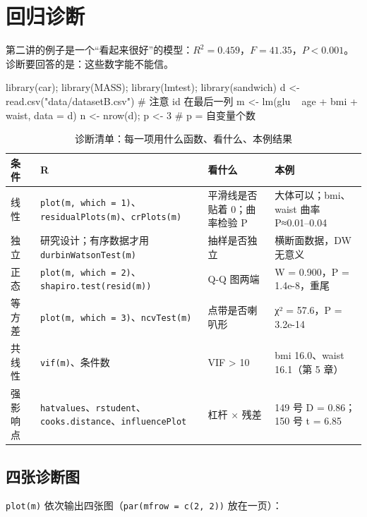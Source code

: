 \section{回归诊断}

第二讲的例子是一个“看起来很好”的模型：$R^2=0.459$，$F=41.35$，$P<0.001$。诊断要回答的是：这些数字能不能信。

\begin{RCode}[R · 模型]
library(car); library(MASS); library(lmtest); library(sandwich)
d <- read.csv("data/datasetB.csv")          # 注意 id 在最后一列
m <- lm(glu ~ age + bmi + waist, data = d)
n <- nrow(d); p <- 3                        # p = 自变量个数
\end{RCode}

\begin{table}[htbp]
\centering\small
\caption{诊断清单：每一项用什么函数、看什么、本例结果}
\label{tab:diag}
\begin{tabular}{@{}p{1.7cm}p{4.6cm}p{3.6cm}p{4.4cm}@{}}
\toprule
条件 & R & 看什么 & 本例\\
\midrule
线性 & \Verb|plot(m, which = 1)|、\Verb|residualPlots(m)|、\Verb|crPlots(m)| & 平滑线是否贴着 0；曲率检验 P & 大体可以；bmi、waist 曲率 P≈0.01–0.04\\
独立 & 研究设计；有序数据才用 \Verb|durbinWatsonTest(m)| & 抽样是否独立 & 横断面数据，DW 无意义\\
正态 & \Verb|plot(m, which = 2)|、\Verb|shapiro.test(resid(m))| & Q-Q 图两端 & W = 0.900，P = 1.4e-8，重尾\\
等方差 & \Verb|plot(m, which = 3)|、\Verb|ncvTest(m)| & 点带是否喇叭形 & χ² = 57.6，P = 3.2e-14\\
共线性 & \Verb|vif(m)|、条件数 & VIF > 10 & bmi 16.0、waist 16.1（第 5 章）\\
强影响点 & \Verb|hatvalues|、\Verb|rstudent|、\Verb|cooks.distance|、\Verb|influencePlot| & 杠杆 × 残差 & 149 号 D = 0.86；150 号 t = 6.85\\
\bottomrule
\end{tabular}
\end{table}

\subsection{四张诊断图}
\Verb|plot(m)| 依次输出四张图（\Verb|par(mfrow = c(2, 2))| 放在一页）：

